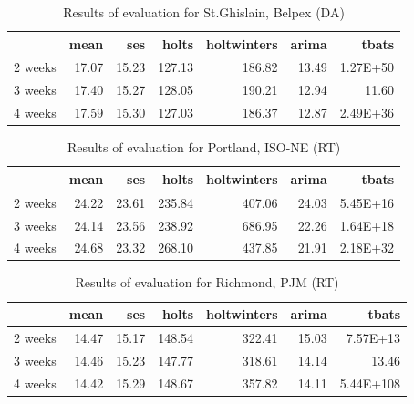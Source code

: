 \begin{table}[ht]
\centering
\begin{tabular}{rrrrrrr}
  \hline
 & mean & ses & holts & holtwinters & arima & tbats \\ 
  \hline
2 weeks & 17.07 & 15.23 & 127.13 & 186.82 & 13.49 & 1.27E+50 \\ 
  3 weeks & 17.40 & 15.27 & 128.05 & 190.21 & 12.94 & 11.60 \\ 
  4 weeks & 17.59 & 15.30 & 127.03 & 186.37 & 12.87 & 2.49E+36 \\ 
   \hline
\end{tabular}
\caption{Results of evaluation for St.Ghislain, Belpex (DA)}
\end{table}
\begin{table}[ht]
\centering
\begin{tabular}{rrrrrrr}
  \hline
 & mean & ses & holts & holtwinters & arima & tbats \\ 
  \hline
2 weeks & 24.22 & 23.61 & 235.84 & 407.06 & 24.03 & 5.45E+16 \\ 
  3 weeks & 24.14 & 23.56 & 238.92 & 686.95 & 22.26 & 1.64E+18 \\ 
  4 weeks & 24.68 & 23.32 & 268.10 & 437.85 & 21.91 & 2.18E+32 \\ 
   \hline
\end{tabular}
\caption{Results of evaluation for Portland, ISO-NE (RT)}
\end{table}
\begin{table}[ht]
\centering
\begin{tabular}{rrrrrrr}
  \hline
 & mean & ses & holts & holtwinters & arima & tbats \\ 
  \hline
2 weeks & 14.47 & 15.17 & 148.54 & 322.41 & 15.03 & 7.57E+13 \\ 
  3 weeks & 14.46 & 15.23 & 147.77 & 318.61 & 14.14 & 13.46 \\ 
  4 weeks & 14.42 & 15.29 & 148.67 & 357.82 & 14.11 & 5.44E+108 \\ 
   \hline
\end{tabular}
\caption{Results of evaluation for Richmond, PJM (RT)}
\end{table}



